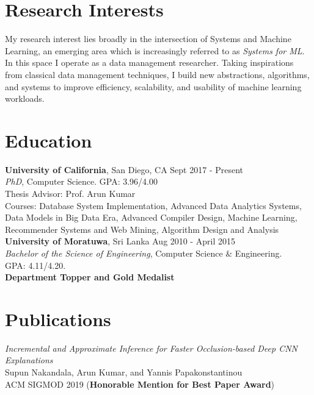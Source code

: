 \documentclass[margin]{res}
\begin{document}

\address{Phone: (+1) 812-558-6888\\ Email: snakanda@eng.ucsd.edu\\ Web: \href{https://scnakandala.github.io}{scnakandala.github.io}}
\address{3232 EBU3B CSE\\9500 Gilman Drive\\La Jolla, CA 92093}


\begin{resume}
\section{Research Interests}
My research interest lies broadly in the intersection of Systems and Machine Learning, an emerging area which is increasingly referred to as \textit{Systems for ML}. In this space I operate as a data management researcher.
Taking inspirations from classical data management techniques, I build new abstractions, algorithms, and systems to improve efficiency, scalability, and usability of machine learning workloads.


\section{Education}
\textbf{University of California}, San Diego, CA \hfill Sept 2017 - Present
\\ 
{\sl PhD}, Computer Science. GPA: 3.96/4.00 
\\
Thesis Advisor: Prof. Arun Kumar\\
Courses: Database System Implementation, Advanced Data Analytics Systems, Data Models in Big Data Era, Advanced Compiler Design, Machine Learning, Recommender Systems and Web Mining, Algorithm Design and Analysis
\vspace{4mm}
\\
\textbf{University of Moratuwa}, Sri Lanka \hfill Aug 2010 - April 2015
\\
{\sl Bachelor of the Science of Engineering}, Computer Science \& Engineering. \\ GPA: 4.11/4.20.
\\ \textbf{Department Topper and Gold Medalist}



\section{Publications}

\par
\textit{Incremental and Approximate Inference for Faster Occlusion-based Deep CNN Explanations} \\
Supun Nakandala, Arun Kumar, and Yannis Papakonstantinou \\
ACM SIGMOD 2019 (\textbf{Honorable Mention for Best Paper Award})


\end{resume}
\end{document}
